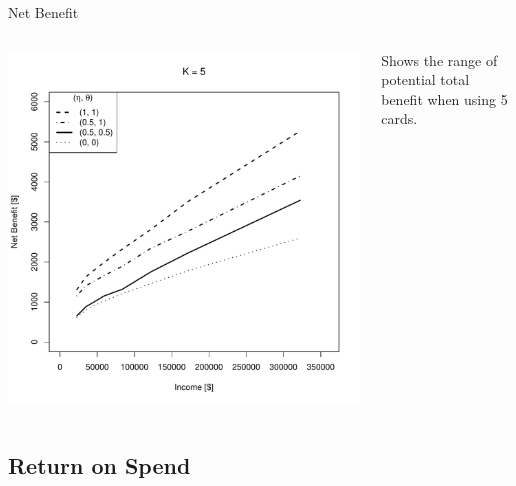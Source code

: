 \begin{frame}{Net Benefit}
    \begin{columns}[c]
        \begin{column}{0.7\textwidth}
            \includegraphics[width=0.9\textheight]{../Figures/NBvsIncome_K5.pdf}
        \end{column}
        \begin{column}{0.3\textwidth}
            \centering
            Shows the range of potential total benefit when using 5 cards.
        \end{column}
    \end{columns}
\end{frame} 

\subsection{Return on Spend}

